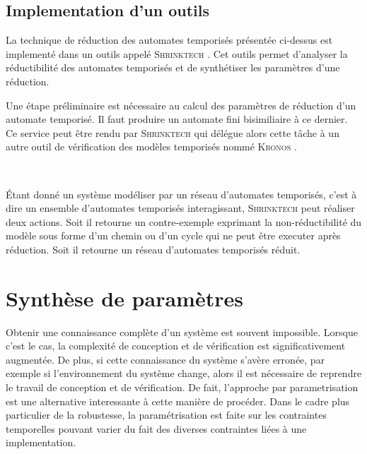 \documentclass{article}
\begin{document}
    \subsection{Implementation d'un outils}
    
      La technique de réduction des automates temporisés présentée ci-dessus est
      implementé dans un outils appelé \textsc{Shrinktech} \cite{sankur13}. Cet
      outils permet d'analyser la réductibilité des automates temporisés et de
      synthétiser les paramètres d'une réduction.
      
      Une étape préliminaire est nécessaire au calcul des paramètres de
      réduction d'un automate temporisé. Il faut produire un automate fini
      bisimiliaire à ce dernier. Ce service peut être rendu par
      \textsc{Shrinktech} qui délégue alors cette tâche à un autre outil de
      vérification des modèles temporisés nommé \textsc{Kronos} \cite{yovine97}.

      ~

      Étant donné un système modéliser par un réseau d'automates temporisés,
      c'est à dire un ensemble d'automates temporisés interagissant,
      \textsc{Shrinktech} peut réaliser deux actions. Soit il retourne un
      contre-exemple exprimant la non-réductibilité du modèle sous forme d'un
      chemin ou d'un cycle qui ne peut être executer après réduction. Soit il
      retourne un réseau d'automates temporisés réduit.

  \section{Synthèse de paramètres}
  \label{sec:parameter-synthesis}


    Obtenir une connaissance complète d'un système est souvent
    impossible. Lorsque c'est le cas, la complexité de conception et de
    vérification est significativement augmentée. De plus, si cette connaissance
    du système s'avère erronée, par exemple si l'environnement du système
    change, alors il est nécessaire de reprendre le travail de conception et de
    vérification. De fait, l'approche par parametrisation est une alternative
    interessante à cette manière de procéder. Dans le cadre plus particulier de
    la robustesse, la paramétrisation est faite sur les contraintes temporelles
    pouvant varier du fait des diverses contraintes liées à une implementation.
\end{document}
